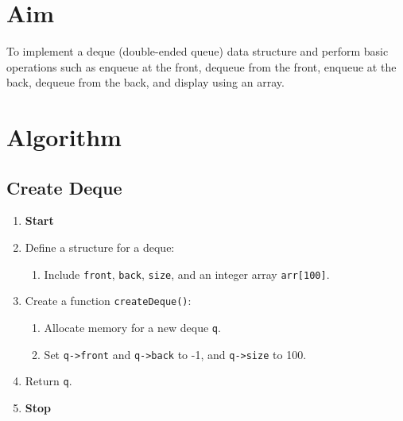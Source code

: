 
\section{Aim}
To implement a deque (double-ended queue) data structure and perform basic operations such as enqueue at the front, dequeue from the front, enqueue at the back, dequeue from the back, and display using an array.

\section{Algorithm}
 {\selectfont

  \subsection{Create Deque}
  \begin{enumerate}[label=\arabic*:,left=0pt]
    \item \textbf{Start}
    \item Define a structure for a deque:
          \begin{enumerate}[label=2.\arabic*.]
            \item Include \texttt{front}, \texttt{back}, \texttt{size}, and an integer array \texttt{arr[100]}.
          \end{enumerate}
    \item Create a function \texttt{createDeque()}:
          \begin{enumerate}[label=3.\arabic*.]
            \item Allocate memory for a new deque \texttt{q}.
            \item Set \texttt{q->front} and \texttt{q->back} to -1, and \texttt{q->size} to 100.
          \end{enumerate}
    \item Return \texttt{q}.
    \item \textbf{Stop}
  \end{enumerate}

}
